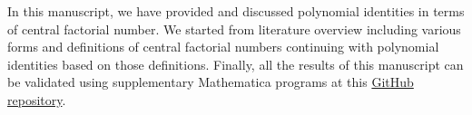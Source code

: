 In this manuscript, we have provided and discussed polynomial identities in terms of central factorial number.
We started from literature overview including various forms and definitions of central factorial numbers
continuing with polynomial identities based on those definitions.
Finally,
all the results of this manuscript can be validated using supplementary
Mathematica programs at this
\href{https://github.com/kolosovpetro/PolynomialIdentitiesInvolvingCentralFactorialNumbers}{GitHub repository}.

